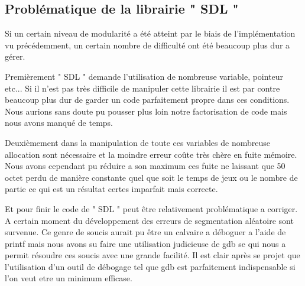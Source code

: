 \documentclass[12pt]{article}
\begin{document}
\subsection {Problématique de la librairie " SDL "}
Si un certain niveau de modularité a été atteint par le biais de l’implémentation vu
précédemment, un certain nombre de difficulté ont été beaucoup plus dur a gérer.
\par Premièrement " SDL " demande l'utilisation de nombreuse variable, pointeur etc...
Si il n'est pas très difficile de manipuler cette librairie il est par contre beaucoup plus
dur de garder un code parfaitement propre dans ces conditions.
Nous aurions sans doute pu pousser plus loin notre factorisation de code mais nous
avons manqué de temps.
\par Deuxièmement dans la manipulation de toute ces variables de nombreuse allocation sont
nécessaire et la moindre erreur coûte très chère en fuite mémoire.
Nous avons cependant pu réduire a son maximum ces fuite ne laissant que 50 octet
perdu de manière constante quel que soit le temps de jeux ou le nombre de partie ce qui est
un résultat certes imparfait mais correcte.
\par Et pour finir le code de " SDL " peut être relativement problématique a corriger. A certain
moment du développement des erreurs de segmentation aléatoire sont survenue.
Ce genre de soucis aurait pu être un calvaire a déboguer a l'aide de printf mais
nous avons su faire une utilisation judicieuse de gdb se qui nous a permit résoudre
ces soucis avec une grande facilité. Il est clair après se projet que l'utilisation d'un outil de débogage
tel que gdb est parfaitement indispensable si l'on veut etre un minimum efficase.


\newpage
\end{document}
